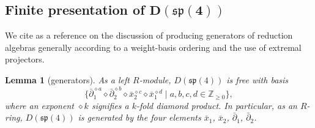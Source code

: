 \documentclass[10pt,a4paper]{amsart}
\numberwithin{equation}{section}
\newtheorem{Lemma}[Theorem]{Lemma}
\begin{document}
\subsection[Finite presentation of D(sp(4))]{Finite presentation of $\boldsymbol{D(\mathfrak{sp}(4))}$}\label{subsec:PresentationDRAsp4}
\label{sec:presentation}

We cite \cite{khoroshkinDiagonalReductionAlgebras2010} as a reference on the discussion of producing generators of reduction algebras generally according to a weight-basis ordering and the use of extremal projectors.

\begin{Lemma}[generators]\label{lemma:finite-generators}
	As a left $R$-module, $D(\mathfrak{sp}(4))$ is free with basis
	\[
		\bigl\{
		\bar \partial_1^{\diamond a} \diamond
		\bar \partial_2^{\diamond b} \diamond
		\bar x_2^{\diamond c} \diamond
		\bar x_1^{\diamond d}
		\mid a,b,c,d\in\mathbb{Z}_{\geq 0}\bigr\},
	\]
	where an exponent $\diamond k$ signifies a $k$-fold diamond product.
	In particular, as an $R$-ring, $D(\mathfrak{sp}(4))$ is generated by the four elements $\bar{x}_{1}$, $\bar{x}_{2}$, $\bar{\partial}_{1}$, $\bar{\partial}_{2}$.
\end{Lemma}
\end{document}
